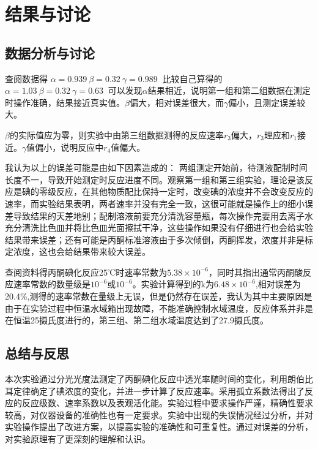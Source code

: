 \documentclass[hyperref,a4paper,UTF8]{ctexart}
\begin{document}
\section{结果与讨论}
\subsection{数据分析与讨论}



查阅数据得
$
    \alpha=0.939 \
    \beta=0.32 \
    \gamma = 0.989 \
$
比较自己算得的
$
    \alpha=1.03\
    \beta=0.32\
    \gamma = 0.63\
$
可以发现$\alpha$结果相近，说明第一组和第二组数据在测定时操作准确，结果接近真实值。$\beta$偏大，相对误差很大，而$\gamma$偏小，且测定误差较大。

$\beta$的实际值应为零，则实验中由第三组数据测得的反应速率$r_3$偏大，$r_3$理应和$r_1$接近。$\gamma$值偏小，说明反应中$r_4$值偏大。

我认为以上的误差可能是由如下因素造成的：
 两组测定开始前，待测液配制时间长度不一，导致开始测定时反应进度不同。观察第一组和第三组实验，理论是该反应是碘的零级反应，在其他物质配比保持一定时，改变碘的浓度并不会改变反应的速率，而实验结果表明，两者速率并没有完全一致，这很可能就是操作上的细小误差导致结果的天差地别；配制溶液前要充分清洗容量瓶，每次操作完要用去离子水充分清洗比色皿并将比色皿光面擦拭干净，这些操作如果没有仔细进行也会给实验结果带来误差；还有可能是丙酮标准溶液由于多次倾倒，丙酮挥发，浓度并非是标定浓度，这也会给结果带来较大误差。


查阅资料得丙酮碘化反应25℃时速率常数为$5.38 \times 10^{-6}$，同时其指出通常丙酮酸反应速率常数的数量级是$10^{-6}$或$10^{-6}$。实验计算得到的k为$6.48 \times 10^{-6}$,相对误差为20.4\%,测得的速率常数在量级上无误，但是仍然存在误差，我认为其中主要原因是由于在实验过程中恒温水域箱出现故障，不能准确控制水域温度，反应体系并非是在恒温25摄氏度进行的，第三组、第二组水域温度达到了27.9摄氏度。

\subsection{总结与反思}

本次实验通过分光光度法测定了丙酮碘化反应中透光率随时间的变化，利用朗伯比耳定律确定了碘浓度的变化，并进一步计算了反应速率。采用孤立系数法得出了反应的反应级数、速率系数以及表观活化能。实验过程中要求操作严谨，精确性要求较高，对仪器设备的准确性也有一定要求。实验中出现的失误情况经过分析，并对实验操作提出了改进方案，以提高实验的准确性和可重复性。通过对误差的分析，对实验原理有了更深刻的理解和认识。
\end{document}
